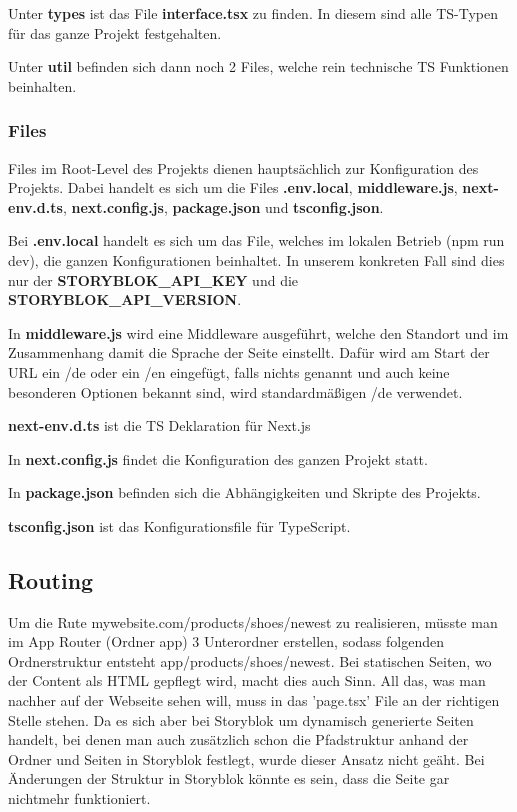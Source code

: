 Unter \textbf{types} ist das File \textbf{interface.tsx} zu finden. In diesem sind alle TS-Typen für das ganze Projekt festgehalten.

Unter \textbf{util} befinden sich dann noch 2 Files, welche rein technische TS Funktionen beinhalten.

\subsubsection*{Files}
Files im Root-Level des Projekts dienen hauptsächlich zur Konfiguration des Projekts. Dabei handelt es sich um die Files \textbf{.env.local}, \textbf{middleware.js}, \textbf{next-env.d.ts}, \textbf{next.config.js}, \textbf{package.json} und \textbf{tsconfig.json}.

Bei \textbf{.env.local} handelt es sich um das File, welches im lokalen Betrieb (npm run dev), die ganzen Konfigurationen beinhaltet. In unserem konkreten Fall sind dies nur der \textbf{STORYBLOK\_API\_KEY} und die \textbf{STORYBLOK\_API\_VERSION}.

In \textbf{middleware.js} wird eine Middleware ausgeführt, welche den Standort und im Zusammenhang damit die Sprache der Seite einstellt. Dafür wird am Start der URL ein /de oder ein /en eingefügt, falls nichts genannt und auch keine besonderen Optionen bekannt sind, wird standardmäßigen /de verwendet.

\textbf{next-env.d.ts} ist die TS Deklaration für Next.js

In \textbf{next.config.js} findet die Konfiguration des ganzen Projekt statt.

In \textbf{package.json} befinden sich die Abhängigkeiten und Skripte des Projekts.

\textbf{tsconfig.json} ist das Konfigurationsfile für TypeScript.

\subsection{Routing}
Um die Rute mywebsite.com/products/shoes/newest zu realisieren, müsste man im App Router (Ordner app) 3 Unterordner erstellen, sodass folgenden Ordnerstruktur entsteht app/products/shoes/newest. Bei statischen Seiten, wo der Content als HTML gepflegt wird, macht dies auch Sinn. All das, was man nachher auf der Webseite sehen will, muss in das 'page.tsx' File an der richtigen Stelle stehen. 
Da es sich aber bei Storyblok um dynamisch generierte Seiten handelt, bei denen man auch zusätzlich schon die Pfadstruktur anhand der Ordner und Seiten in Storyblok festlegt, wurde dieser Ansatz nicht geäht. Bei Änderungen der Struktur in Storyblok könnte es sein, dass die Seite gar nichtmehr funktioniert. 

